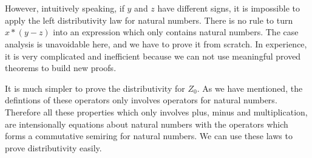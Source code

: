 \begin{code}
\\
\>[4]\<[19]%
\>[19]      \AgdaSymbol{(}  \AgdaSymbol{))} \AgdaSymbol{(} \AgdaSymbol{(}  \AgdaSymbol{)))))}\<%
\\
\>[13]\<[2]%
\>[2]\<%
\\
\>[0]\<[4]%
\>[4] \AgdaSymbol{:}          \AgdaSymbol{(}  \AgdaSymbol{(} \AgdaSymbol{))}  \AgdaSymbol{(}  \AgdaSymbol{)}\<%
\\
\>[0]\<[4]%
\>[4]   \AgdaSymbol{=}  \AgdaSymbol{(} \AgdaSymbol{\_)}\<%
\\
\>[0]\<[4]%
\>[4]  \AgdaSymbol{(} \AgdaSymbol{)} \AgdaSymbol{=} \<%
\\
\>[0]\<[4]%
\>[4]  \AgdaSymbol{(} \AgdaSymbol{)} \AgdaSymbol{=} \<%
\\
\end{code}


However, intuitively speaking, if $y$ and $z$ have different
signs, it is impossible to apply the left distributivity law for
natural numbers. There is no rule to turn $x *
(y  - z)$ into an expression which only contains natural numbers.
The case analysis is unavoidable here, and we have to prove it from scratch.
In experience, it is very complicated and inefficient because we can not use meaningful proved theorems to build new proofs.

It is much simpler to prove the distributivity for $Z_0$. As we have mentioned, the defintions of 
these operators only involves operators for natural
numbers. Therefore all these properties which only
involves plus, minus and multiplication, are intensionally equations about natural numbers with the operators which forms a commutative semiring for natural numbers. We can use these laws to prove distributivity easily.

